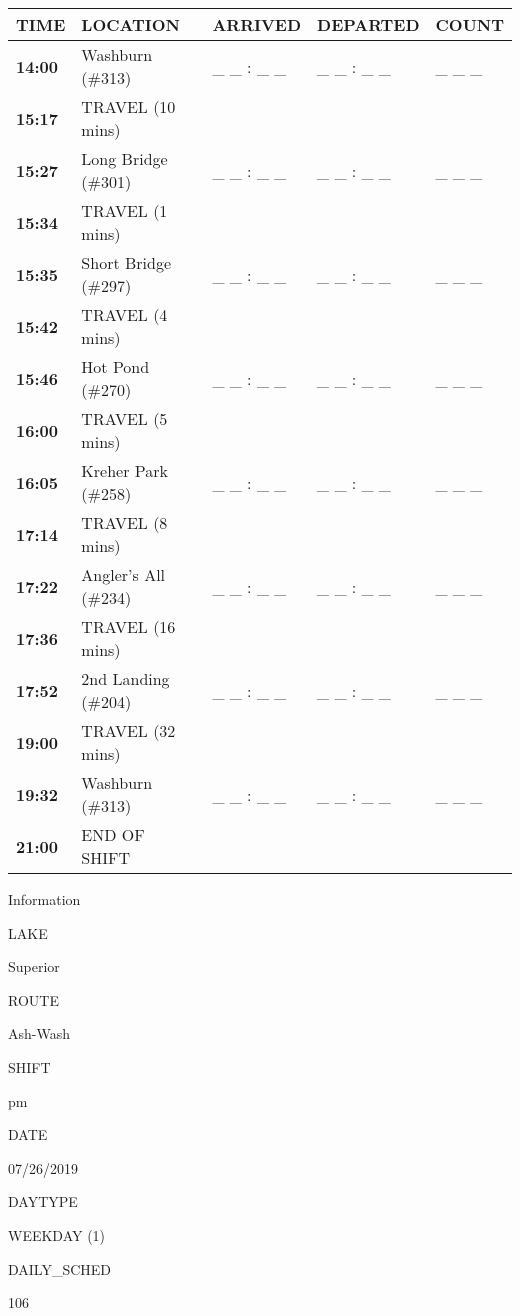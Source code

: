 \documentclass[]{article}
\begin{document}
\begin{tabular}{>{\bfseries}lllll}
\toprule
\textbf{TIME} & \textbf{LOCATION} & \textbf{ARRIVED} & \textbf{DEPARTED} & \textbf{COUNT}\\
\midrule
14:00 & Washburn (\#313) & \_ \_ : \_ \_ & \_ \_ : \_ \_ & \_ \_ \_\\
15:17 & TRAVEL (10 mins) &  &  & \\
15:27 & Long Bridge (\#301) & \_ \_ : \_ \_ & \_ \_ : \_ \_ & \_ \_ \_\\
15:34 & TRAVEL (1 mins) &  &  & \\
15:35 & Short Bridge (\#297) & \_ \_ : \_ \_ & \_ \_ : \_ \_ & \_ \_ \_\\
15:42 & TRAVEL (4 mins) &  &  & \\
15:46 & Hot Pond (\#270) & \_ \_ : \_ \_ & \_ \_ : \_ \_ & \_ \_ \_\\
16:00 & TRAVEL (5 mins) &  &  & \\
16:05 & Kreher Park (\#258) & \_ \_ : \_ \_ & \_ \_ : \_ \_ & \_ \_ \_\\
17:14 & TRAVEL (8 mins) &  &  & \\
17:22 & Angler's All (\#234) & \_ \_ : \_ \_ & \_ \_ : \_ \_ & \_ \_ \_\\
17:36 & TRAVEL (16 mins) &  &  & \\
17:52 & 2nd Landing (\#204) & \_ \_ : \_ \_ & \_ \_ : \_ \_ & \_ \_ \_\\
19:00 & TRAVEL (32 mins) &  &  & \\
19:32 & Washburn (\#313) & \_ \_ : \_ \_ & \_ \_ : \_ \_ & \_ \_ \_\\
21:00 & END OF SHIFT &  &  & \\
\bottomrule
\end{tabular}\newpage

Information

LAKE

Superior

ROUTE

Ash-Wash

SHIFT

pm

DATE

07/26/2019

DAYTYPE

WEEKDAY (1)

DAILY\_SCHED

106

\vspace{24pt}
\end{document}
